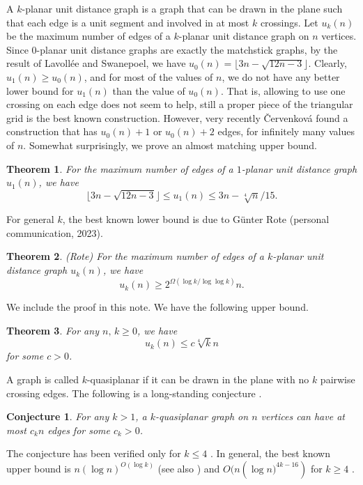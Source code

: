 \documentclass[a4paper,10pt]{article}
\newtheorem{theorem}{Theorem}
\newtheorem{conjecture}{Conjecture}
\begin{document}
A $k$-planar unit distance graph is a graph that can be drawn in the plane such that each edge is a 
unit segment and involved in at most $k$ crossings. Let $u_k(n)$ be the maximum number of edges 
of a $k$-planar unit distance graph on $n$ vertices. Since $0$-planar unit distance graphs are 
exactly the matchstick graphs, by the result of Lavoll\'ee and Swanepoel, 
we have $u_0(n)=\lfloor 3n - \sqrt{12n - 3}\rfloor$. 
Clearly, $u_1(n)\ge u_0(n)$, and for most of the values of $n$, 
we do not have any 
better lower bound for $u_1(n)$ than the value of $u_0(n)$. 
That is, allowing to use one crossing on each edge does not seem to help, still a proper piece of the triangular grid is the best known construction. However, very recently
\v{C}ervenkov\'a \cite{C25} found a construction that has $u_0(n)+1$ or $u_0(n)+2$ edges, for infinitely
many values of $n$. 
Somewhat surprisingly, we prove an almost matching upper bound.

\begin{theorem}\label{1-planar}
For the maximum number of edges of a $1$-planar unit distance graph $u_1(n)$, we have
$$\lfloor 3n - \sqrt{12n - 3}\rfloor\le u_1(n)\le 3n-\sqrt[4]{n}/15.$$
\end{theorem}

For general $k$, the best known lower bound is due to G\"unter Rote (personal communication, 2023).

\begin{theorem}\label{rote} (Rote)
For the maximum number of edges of a $k$-planar
unit distance graph $u_k(n)$, we have
$$u_k(n) \geq 2^{\Omega\left(\log k/\log\log k \right)}n.$$
\end{theorem}

We include the proof in this note. We have the following upper bound.

\begin{theorem}\label{k-planar} For any $n, \, k\ge 0$,
we have
$$u_k(n)\le c\sqrt[4]{k}n$$ for some $c>0$.
\end{theorem}


A graph is called $k$-quasiplanar if it can be drawn in the plane with no $k$ pairwise crossing edges. The following is a long-standing conjecture \cite{BMP05}. 

\begin{conjecture}
For any $k>1$, a $k$-quasiplanar graph on $n$ vertices 
can have at most $c_kn$ edges for some $c_k>0$.
\end{conjecture}

The conjecture has been verified only for $k\le 4$ \cite{AT07, A09}. In general, the best known upper bound is $n(\log n)^{O(\log k)}$ \cite{FP14} (see also \cite{FPS24}) and $O(n\left(\log n)^{4k-16}\right)$ for $k \geq 4$ \cite{PRT06}.
\end{document}
